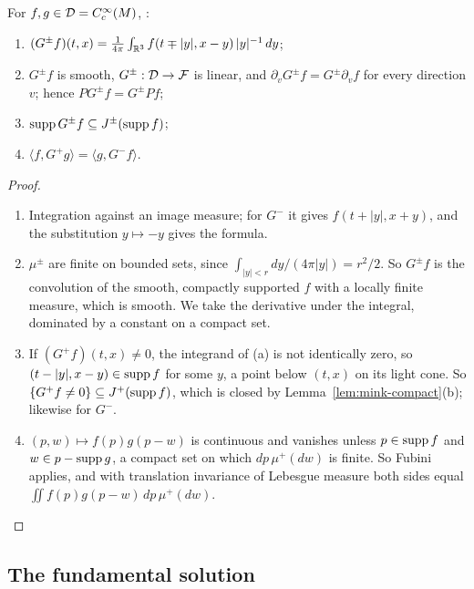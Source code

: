 \begin{proposition}\label{prop:kirchhoff}
For $f,g\in\mathcal D=C_c^\infty(M)$, :
\begin{enumerate}[label=(\alph*),leftmargin=2.5em]
\item $(G^\pm f)(t,x)=\frac1{4\pi}\int_{\mathbb R^3}f(t\mp|y|,x-y)\,|y|^{-1}\,dy$;
\item $G^\pm f$ is smooth, $G^\pm:\mathcal D\to\mathcal F$ is linear, and $\partial_vG^\pm f=G^\pm\partial_vf$ for
every direction $v$; hence $PG^\pm f=G^\pm Pf$;
\item $\operatorname{supp} G^\pm f\subseteq J^\pm(\operatorname{supp} f)$;
\item $\langle f,G^+g\rangle=\langle g,G^-f\rangle$.
\end{enumerate}
\end{proposition}
\begin{proof}
\begin{enumerate}[leftmargin=2.5em]
\item[(a)] Integration against an image measure; for $G^-$ it gives $f(t+|y|,x+y)$, and the
substitution $y\mapsto-y$ gives the formula.
\item[(b)] $\mu^\pm$ are finite on bounded sets, since $\int_{|y|<r}dy/(4\pi|y|)=r^2/2$. So $G^\pm f$ is
the convolution of the smooth, compactly supported $f$ with a locally finite measure, which is
smooth. We take the derivative under the integral, dominated by a constant on a compact set.
\item[(c)] If $(G^+f)(t,x)\neq0$, the integrand of (a) is not identically zero, so
$(t-|y|,x-y)\in\operatorname{supp} f$ for some $y$, a point below $(t,x)$ on its light cone. So
$\{G^+f\neq0\}\subseteq J^+(\operatorname{supp} f)$, which is closed by Lemma~\ref{lem:mink-compact}(b); likewise
for $G^-$.
\item[(d)] $(p,w)\mapsto f(p)g(p-w)$ is continuous and vanishes unless $p\in\operatorname{supp} f$ and
$w\in p-\operatorname{supp} g$, a compact set on which $dp\,\mu^+(dw)$ is finite. So Fubini applies, and with
translation invariance of Lebesgue measure both sides equal $\iint f(p)g(p-w)\,dp\,\mu^+(dw)$.
\end{enumerate}
\end{proof}
\noindent{}

\subsection{The fundamental solution}

